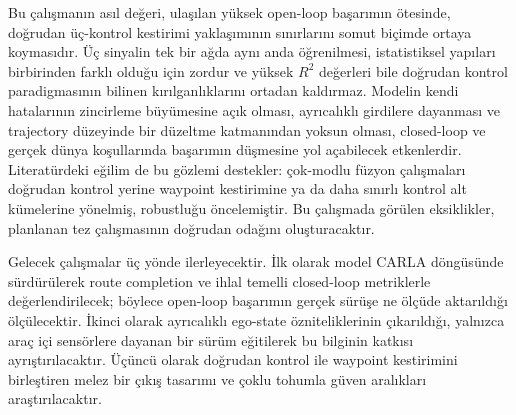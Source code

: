 \documentclass[conference]{IEEEtran}
\begin{document}
Bu çalışmanın asıl değeri, ulaşılan yüksek open-loop başarımın ötesinde, doğrudan üç-kontrol kestirimi yaklaşımının sınırlarını somut biçimde ortaya koymasıdır. Üç sinyalin tek bir ağda aynı anda öğrenilmesi, istatistiksel yapıları birbirinden farklı olduğu için zordur ve yüksek $R^2$ değerleri bile doğrudan kontrol paradigmasının bilinen kırılganlıklarını ortadan kaldırmaz. Modelin kendi hatalarının zincirleme büyümesine açık olması, ayrıcalıklı girdilere dayanması ve trajectory düzeyinde bir düzeltme katmanından yoksun olması, closed-loop ve gerçek dünya koşullarında başarımın düşmesine yol açabilecek etkenlerdir. Literatürdeki eğilim de bu gözlemi destekler: çok-modlu füzyon çalışmaları doğrudan kontrol yerine waypoint kestirimine ya da daha sınırlı kontrol alt kümelerine yönelmiş, robustluğu öncelemiştir. Bu çalışmada görülen eksiklikler, planlanan tez çalışmasının doğrudan odağını oluşturacaktır.

Gelecek çalışmalar üç yönde ilerleyecektir. İlk olarak model CARLA döngüsünde sürdürülerek route completion ve ihlal temelli closed-loop metriklerle değerlendirilecek; böylece open-loop başarımın gerçek sürüşe ne ölçüde aktarıldığı ölçülecektir. İkinci olarak ayrıcalıklı ego-state özniteliklerinin çıkarıldığı, yalnızca araç içi sensörlere dayanan bir sürüm eğitilerek bu bilginin katkısı ayrıştırılacaktır. Üçüncü olarak doğrudan kontrol ile waypoint kestirimini birleştiren melez bir çıkış tasarımı ve çoklu tohumla güven aralıkları araştırılacaktır.



\end{document}
